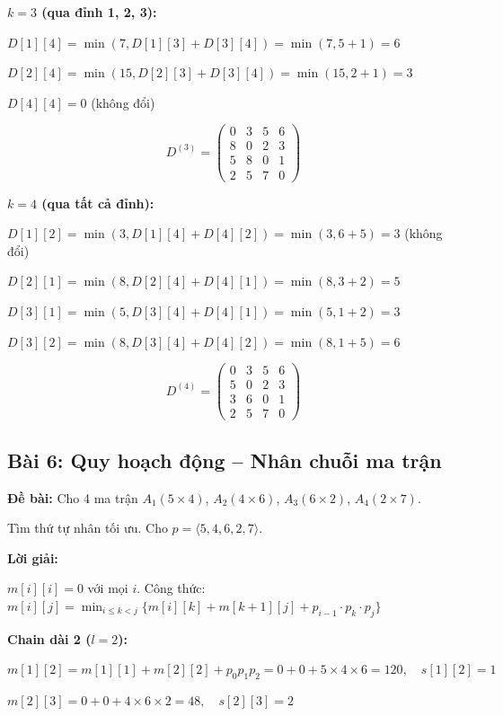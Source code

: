 \documentclass[10pt]{article}
\begin{document}
\textbf{$k = 3$ (qua đỉnh 1, 2, 3):}

$D[1][4] = \min(7, D[1][3] + D[3][4]) = \min(7, 5 + 1) = 6$

$D[2][4] = \min(15, D[2][3] + D[3][4]) = \min(15, 2 + 1) = 3$

$D[4][4] = 0$ (không đổi)

$$D^{(3)} = \begin{pmatrix} 0 & 3 & 5 & 6 \\ 8 & 0 & 2 & 3 \\ 5 & 8 & 0 & 1 \\ 2 & 5 & 7 & 0 \end{pmatrix}$$

\textbf{$k = 4$ (qua tất cả đỉnh):}

$D[1][2] = \min(3, D[1][4] + D[4][2]) = \min(3, 6 + 5) = 3$ (không đổi)

$D[2][1] = \min(8, D[2][4] + D[4][1]) = \min(8, 3 + 2) = 5$

$D[3][1] = \min(5, D[3][4] + D[4][1]) = \min(5, 1 + 2) = 3$

$D[3][2] = \min(8, D[3][4] + D[4][2]) = \min(8, 1 + 5) = 6$

$$\boxed{D^{(4)} = \begin{pmatrix} 0 & 3 & 5 & 6 \\ 5 & 0 & 2 & 3 \\ 3 & 6 & 0 & 1 \\ 2 & 5 & 7 & 0 \end{pmatrix}}$$

\subsection{Bài 6: Quy hoạch động -- Nhân chuỗi ma trận}

\textbf{Đề bài:} Cho 4 ma trận $A_1(5 \times 4)$, $A_2(4 \times 6)$, $A_3(6 \times 2)$, $A_4(2 \times 7)$.

Tìm thứ tự nhân tối ưu. Cho $p = \langle 5, 4, 6, 2, 7 \rangle$.

\textbf{Lời giải:}

$m[i][i] = 0$ với mọi $i$. Công thức: $m[i][j] = \min_{i \leq k < j} \{ m[i][k] + m[k+1][j] + p_{i-1} \cdot p_k \cdot p_j \}$

\textbf{Chain dài 2 ($l = 2$):}

$m[1][2] = m[1][1] + m[2][2] + p_0 p_1 p_2 = 0 + 0 + 5 \times 4 \times 6 = \boxed{120}, \quad s[1][2] = 1$

$m[2][3] = 0 + 0 + 4 \times 6 \times 2 = \boxed{48}, \quad s[2][3] = 2$
\end{document}
